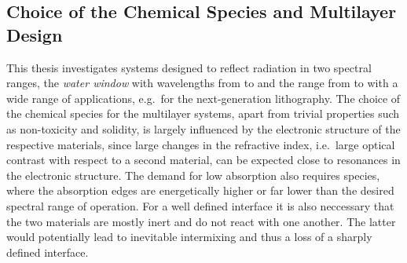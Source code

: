 \subsection{Choice of the Chemical Species and Multilayer Design}
\label{ch_exp:sec_multilayer_design}
This thesis investigates systems designed to reflect radiation in two spectral ranges, the \emph{water window} with wavelengths from  to  and the range from  to  with a wide range of applications, e.g.~for the next-generation lithography. The choice of the chemical species for the multilayer systems, apart from trivial properties such as non-toxicity and solidity, is largely influenced by the electronic structure of the respective materials, since large changes in the refractive index, i.e.~large optical contrast with respect to a second material, can be expected close to resonances in the electronic structure. The demand for low absorption also requires species, where the absorption edges are energetically higher or far lower than the desired spectral range of operation. For a well defined interface it is also neccessary that the two materials are mostly inert and do not react with one another. The latter would potentially lead to inevitable intermixing and thus a loss of a sharply defined interface.

